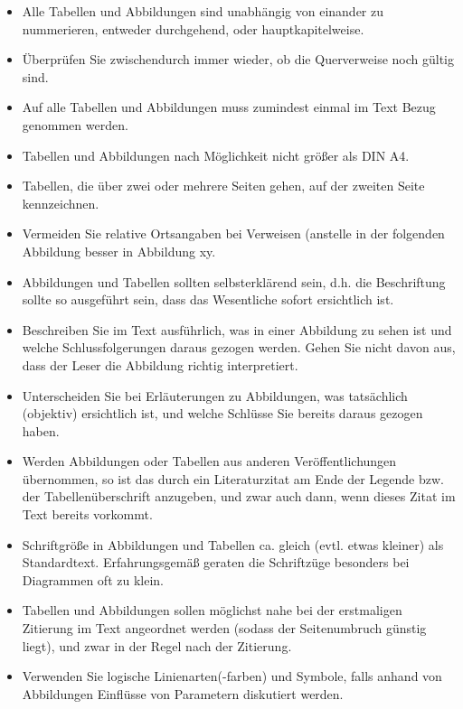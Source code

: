 \begin{itemize}
    \item Alle Tabellen und Abbildungen sind unabhängig von einander zu nummerieren, entweder durchgehend, oder  hauptkapitelweise.
    \item Überprüfen Sie zwischendurch immer wieder, ob die Querverweise noch gültig sind.
    \item Auf alle Tabellen und Abbildungen muss zumindest einmal im Text Bezug genommen werden.
    \item Tabellen und Abbildungen nach Möglichkeit nicht größer als DIN A4.
    \item Tabellen, die über zwei oder mehrere Seiten gehen, auf der zweiten Seite kennzeichnen.
    \item Vermeiden Sie {\glqq}relative Ortsangaben{\grqq} bei Verweisen (anstelle {\glqq}in der folgenden Abbildung{\grqq} besser {\glqq}in Abbildung xy{\grqq}.
    \item Abbildungen und Tabellen sollten selbsterklärend sein, d.h. die Beschriftung sollte so ausgeführt sein, dass das Wesentliche sofort ersichtlich ist.
    \item Beschreiben Sie im Text ausführlich, was in einer Abbildung zu sehen ist und welche Schlussfolgerungen daraus gezogen werden. Gehen Sie nicht davon aus, dass der Leser die Abbildung richtig interpretiert.
    \item Unterscheiden Sie bei Erläuterungen zu Abbildungen, was tatsächlich (objektiv) ersichtlich ist, und welche Schlüsse Sie bereits daraus gezogen haben.
    \item Werden Abbildungen oder Tabellen aus anderen Veröffentlichungen übernommen, so ist das durch ein Literaturzitat am Ende der Legende bzw. der Tabellenüberschrift anzugeben, und zwar auch dann, wenn dieses Zitat im Text bereits vorkommt.
    \item Schriftgröße in Abbildungen und Tabellen ca. gleich (evtl. etwas kleiner) als Standardtext. Erfahrungsgemäß geraten die Schriftzüge besonders bei Diagrammen oft zu klein.

    \item Tabellen und Abbildungen sollen möglichst nahe bei der erstmaligen Zitierung im Text angeordnet werden (sodass der Seitenumbruch günstig liegt), und zwar in der Regel nach der Zitierung.
    \item Verwenden Sie logische Linienarten(-farben) und Symbole, falls anhand von Abbildungen Einflüsse von Parametern diskutiert werden.
    

\end{itemize}
